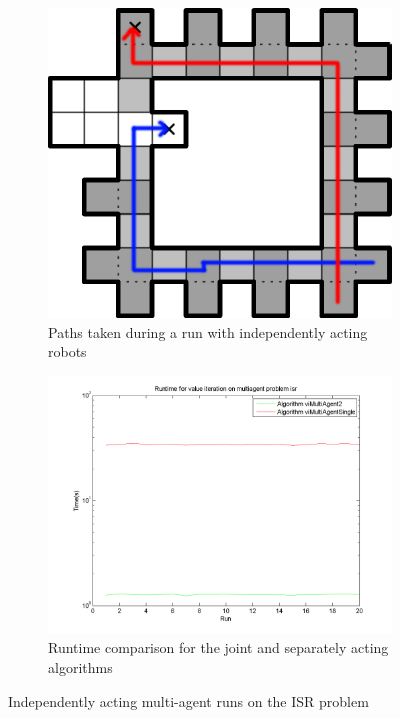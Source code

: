 \documentclass[10pt,a4paper]{article}
\begin{document}
\begin{figure}
        \centering
        \begin{subfigure}{0.4\textwidth}
                \includegraphics[width=\textwidth]{todo/isr/path-single.png}
                \caption{Paths taken during a run with independently acting robots}
                \label{fig:single_isr_part1}
                \hspace{10pt}
        \end{subfigure}
        \quad
        \begin{subfigure}{0.48\textwidth}
        		\includegraphics[width=\textwidth]{todo/isr/timings_vi-2.png}
                \caption{Runtime comparison for the joint and separately acting algorithms}
                \label{fig:single_isr_part2}
                \hspace{-10pt}
        \end{subfigure}
        \caption{Independently acting multi-agent runs on the ISR problem}
        \label{fig:single_isr}
\end{figure}
\end{document}
